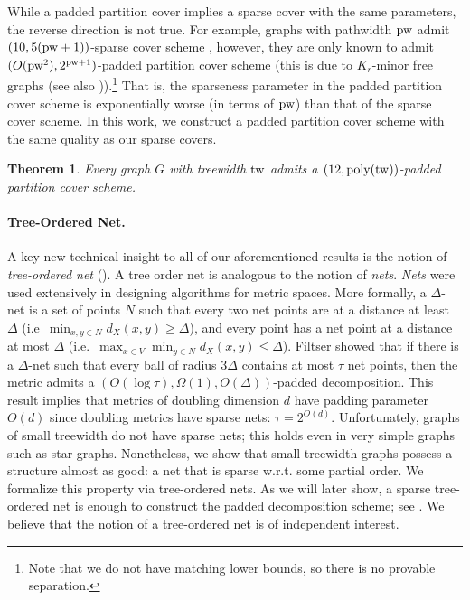 \documentclass{article}
\newtheorem{theorem}{Theorem}\newtheorem{lemma}[theorem]{Lemma}\newtheorem{proposition}[theorem]{Proposition}\newtheorem{corollary}[theorem]{Corollary}\newtheorem{definition}[theorem]{Definition}\newtheorem{claim}[theorem]{Claim}\newtheorem{remark}[theorem]{Remark}\newtheorem{observation}[theorem]{Observation}\newtheorem{conjecture}[theorem]{Conjecture}\newtheorem{example}[theorem]{Example}
\newcommand{\tw}{{\rm tw}}
\newcommand{\pw}{{\rm pw}}
\newcommand{\poly}{\mathrm{poly}}
\begin{document}
While a padded partition cover implies a sparse cover with the same parameters, the reverse direction is not true. For example, graphs with pathwidth $\pw$ admit $(10,5(\pw+1))$-sparse cover scheme \cite{Fil20}, however, they are only known to admit  $(O(\pw^2),2^{\pw+1})$-padded partition cover scheme (this is due to $K_r$-minor free graphs \cite{KPR93,FT03} (see also \cite{KLMN04,Fil20})).\footnote{Note that we do not have matching lower bounds, so there is no provable separation.} That is, the sparseness parameter in the padded partition cover scheme is exponentially worse (in terms of $\pw$) than that of the sparse cover scheme. In this work, we construct a padded partition cover scheme with the same quality as our sparse covers.


\begin{theorem}\label{thm:PaddedPartitionCoverTW}
	Every graph $G$ with treewidth $\tw$ admits a  $\left(12,\poly(\tw)\right)$-padded partition cover scheme. 
\end{theorem}


\paragraph*{Tree-Ordered Net.} A key new technical insight to all of our aforementioned results is the notion of \emph{tree-ordered net} (). A tree order net is analogous to the notion of \emph{nets}. \emph{Nets} were used extensively in designing algorithms for metric spaces. More formally, a $\Delta$-net is a set of points $N$ such that every two net points are at a distance at least $\Delta$ (i.e~$\min_{x,y\in N}d_X(x,y)\ge\Delta$), and every point has a net point at a distance at most $\Delta$ (i.e.~$\max_{x\in V}\min_{y\in N}d_X(x,y)\le\Delta$). Filtser \cite{Fil19Approx} showed that if there is a $\Delta$-net such that every ball of radius $3\Delta$ contains at most $\tau$ net points, then the metric admits a $\left(O(\log\tau),\Omega(1),O(\Delta)\right)$-padded decomposition. This result implies that metrics of doubling dimension $d$  have padding parameter $O(d)$ since doubling metrics have sparse nets: $\tau = 2^{O(d)}$. Unfortunately, graphs of small treewidth do not have sparse nets; this holds even in very simple graphs such as star graphs. Nonetheless, we show that small treewidth graphs possess a structure almost as good: a net that is sparse w.r.t. some partial order. We formalize this property via tree-ordered nets.  As we will later show, a sparse tree-ordered net is enough to construct the padded decomposition scheme; see . We believe that the notion of a tree-ordered net is of independent interest.
\end{document}
